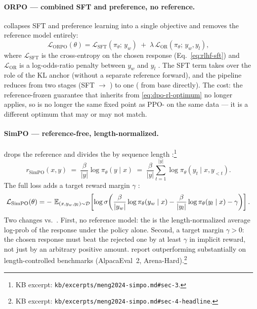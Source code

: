 \paragraph{ORPO --- combined SFT and preference, no reference.} 
collapses SFT and preference learning into a single objective and
removes the reference model entirely:
\begin{equation}
\mathcal{L}_{\mathrm{ORPO}}(\theta)
  = \mathcal{L}_{\mathrm{SFT}}(\pi_\theta;\, y_w)
    \;+\; \lambda \, \mathcal{L}_{\mathrm{OR}}(\pi_\theta;\, y_w, y_l),
\label{eq:orpo}
\end{equation}
where $\mathcal{L}_{\mathrm{SFT}}$ is the cross-entropy on the chosen
response (Eq.~\cref{eq:rlhf-sft}) and $\mathcal{L}_{\mathrm{OR}}$ is a
log-odds-ratio penalty between $y_w$ and $y_l$
\citep[Hong et al.\ 2024]{rafailov2023-dpo}.
The SFT term takes over the role of the KL anchor (without a separate
reference forward), and the pipeline reduces from two stages
(SFT $\to$ ) to one ( from base directly). The cost: the
reference-frozen guarantee that  inherits from
\cref{eq:dpo-rl-optimum} no longer applies, so  is no longer the
same fixed point as PPO- on the same data --- it is a different
optimum that may or may not match.

\paragraph{SimPO --- reference-free, length-normalized.}  drops
the reference and divides the  by sequence length
\citep[\S 3]{meng2024-simpo}:\footnote{KB excerpt:
\nolinkurl{kb/excerpts/meng2024-simpo.md#sec-3}.}
\begin{equation}
r_{\mathrm{SimPO}}(x, y)
  \;=\; \frac{\beta}{|y|} \log \pi_\theta(y \mid x)
  \;=\; \frac{\beta}{|y|} \sum_{t=1}^{|y|} \log \pi_\theta(y_t \mid x, y_{<t}).
\label{eq:simpo-reward}
\end{equation}
The full loss adds a target reward margin $\gamma$
\citep[\S 3, the SimPO loss]{meng2024-simpo}:
\begin{equation}
\mathcal{L}_{\mathrm{SimPO}}(\theta)
  = -\, \operatorname{\mathbb{E}}_{(x, y_w, y_l) \sim \mathcal{D}}
    \!\left[\log \sigma\!\left(
       \frac{\beta}{|y_w|} \log \pi_\theta(y_w \mid x)
       - \frac{\beta}{|y_l|} \log \pi_\theta(y_l \mid x)
       - \gamma
    \right)\right].
\label{eq:simpo-loss}
\end{equation}
Two changes vs.\ . First, no reference model: the 
is the length-normalized average log-prob of the response under the
policy alone. Second, a target margin $\gamma > 0$: the chosen
response must beat the rejected one by at least $\gamma$ in implicit
reward, not just by an arbitrary positive amount. \citet[\S 4]{meng2024-simpo}
report  outperforming  substantially on length-controlled
benchmarks (AlpacaEval~2, Arena-Hard).\footnote{KB excerpt:
\nolinkurl{kb/excerpts/meng2024-simpo.md#sec-4-headline}.}

